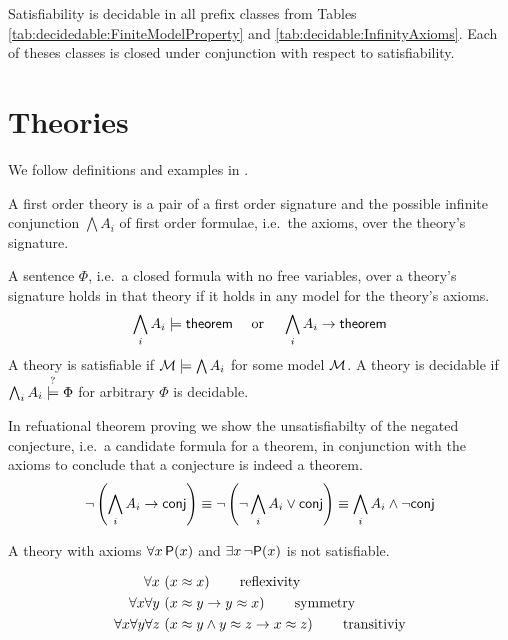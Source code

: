 \begin{lemma}
	Satisfiability is decidable \cite{MR1482227} in all prefix classes from Tables 
	\ref{tab:decidedable:FiniteModelProperty} and \ref{tab:decidable:InfinityAxioms}.
	Each of theses classes is closed under conjunction with respect to satisfiability.
\end{lemma}



\section{Theories}\label{sec:decidable:fol:theories}

We follow definitions and examples in \cite{AM2015L}.

\begin{definition}[Theory]
	A {\myem first order theory} is a pair of a first order signature 
	and the possible infinite conjunction $\bigwedge A_i$ of first order formulae, 
	i.e.~the axioms, over the theory's signature. 
	
	A sentence $\Phi$, i.e.~a closed formula with no free variables, 
	over a theory's signature
	holds in that theory 
	if it holds in any model for the theory's axioms.
	\[
		\bigwedge_i A_i \models \mathsf{theorem} 
		\quad\text{ or }\quad
		\bigwedge_i A_i \rightarrow \mathsf{theorem} 
	\]
	A theory is satisfiable if ${\mathcal M}\models\bigwedge A_i$ for some model ${\mathcal M}$.
	A theory is decidable if $\bigwedge_i A_i \stackrel{\Large ?}{\models} \Phi$ for arbitrary $\Phi$
	is decidable.
\end{definition}
%
\begin{remark} 
In refuational theorem proving
we show the unsatisfiabilty 
of the negated conjecture, 
i.e.~a candidate formula for a theorem,
in conjunction with the axioms
to conclude that a conjecture is indeed a theorem.
\[
	\lnot\left(\bigwedge_i A_i \rightarrow \mathsf{conj}\right) \equiv
	\lnot\left(\lnot\bigwedge_i A_i \lor \mathsf{conj}\right) \equiv
	\bigwedge_i A_i \land \lnot \mathsf{conj}
\]
\end{remark}

\begin{example}
	A theory with axioms $\forall x\,{\mathsf P}(x)$ and $\exists x\,\lnot{\mathsf P}(x)$ is not satisfiable.
\end{example}

\begin{definition}
	[Equivalence]
	\label{def:equivalence:axioms}
\begin{align*}
\forall x\, 
&\left(x \approx x\right) 
\tag*{reflexivity}
\\
\forall x \forall y\, 
&\left(x \approx y \rightarrow y \approx x \right)
\tag*{symmetry} 
\\
\forall x \forall y \forall z\,
&\left(x \approx y \land y\approx z \rightarrow x\approx z\right) 
\tag*{transitiviy}
\end{align*}
\end{definition}

